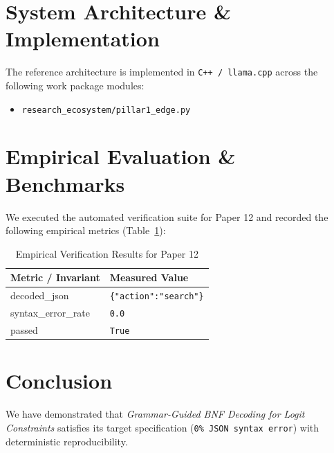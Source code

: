 \documentclass[10pt,twocolumn]{article}
\begin{document}
\section{System Architecture \& Implementation}
The reference architecture is implemented in \texttt{C++ / llama.cpp} across the following work package modules:
\begin{itemize}
  \item \texttt{research\_ecosystem/pillar1\_edge.py}
\end{itemize}

\section{Empirical Evaluation \& Benchmarks}
We executed the automated verification suite for Paper 12 and recorded the following empirical metrics (Table~\ref{tab:metrics}):

\begin{table}[htbp]
\centering
\caption{Empirical Verification Results for Paper 12}
\label{tab:metrics}
\begin{tabular}{ll}
\toprule
\textbf{Metric / Invariant} & \textbf{Measured Value} \\
\midrule
    decoded\_json & \texttt{\{"action":"search"\}} \\
    syntax\_error\_rate & \texttt{0.0} \\
    passed & \texttt{True} \\
\bottomrule
\end{tabular}
\end{table}

\section{Conclusion}
We have demonstrated that \textit{Grammar-Guided BNF Decoding for Logit Constraints} satisfies its target specification (\texttt{0\% JSON syntax error}) with deterministic reproducibility.



\end{document}
